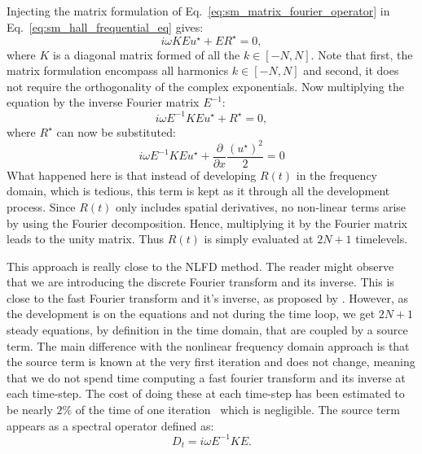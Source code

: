 Injecting the matrix formulation of 
Eq.~\ref{eq:sm_matrix_fourier_operator} in 
Eq.~\ref{eq:sm_hall_frequential_eq}
gives:
\begin{equation}
	i \omega K E u^\star + E R^\star = 0,
\end{equation}
where $K$ is a diagonal matrix formed of all the $k \in [-N, N]$.
Note that first, the matrix formulation encompass all harmonics
$k \in [-N, N]$ and second, it does not require the
orthogonality of the complex exponentials.
Now multiplying the equation by the inverse Fourier matrix $E^{-1}$:
\begin{equation}
	i \omega E^{-1} K E u^\star + R^\star = 0,
	\label{eq:sm_hb_matrix_form_mono}
\end{equation}
where $R^\star$ can now be substituted:
\begin{equation}
		i \omega E^{-1} K E u^\star + 
		\displaystyle \frac{\partial}{\partial x}
		\frac{(u^\star)^2}{2} = 0
\end{equation}
What happened here is that instead of developing $R(t)$
in the frequency domain, which is tedious, this term is kept
as it through all the development process. 
Since $R(t)$ only includes spatial derivatives, no non-linear
terms
arise by using the Fourier decomposition. Hence, multiplying it
by the Fourier matrix leads to the unity matrix. 
Thus $R(t)$ is simply evaluated at $2N+1$ timelevels.

This approach is really close to the NLFD method.
The reader might observe that we are introducing the discrete Fourier
transform and its inverse. This is close to the fast Fourier transform
and it's inverse, as proposed by \citet{McMullen2001}. However,
as the development is on the equations and not during the time loop,
we get $2N+1$ steady equations, by definition in the time
domain, that are coupled by a source term.
The main difference with the nonlinear frequency domain approach
is that the source term is known at the very first iteration and does
not change, meaning that we do not spend time computing a
fast fourier transform and its inverse at each time-step.
The cost of doing these at each time-step has been estimated
to be nearly $2\%$ of the time of one iteration~\cite{Kachra2008} 
which is negligible.
The source term appears as a spectral operator defined as:
\begin{equation}
	D_t = i \omega E^{-1} K E.
	\label{eq:sm_hb_mono_source_term_matrix}
\end{equation}

